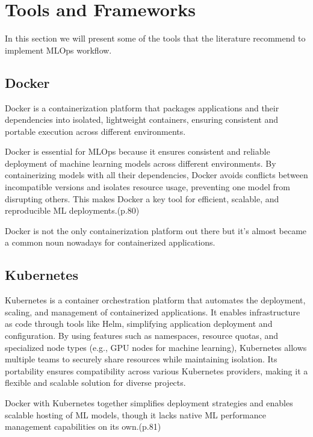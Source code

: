 \section{Tools and Frameworks}\label{sec:tools}

In this section we will present some of the tools that the literature recommend to implement MLOps workflow.

\subsection{Docker}\label{subsec:docker}
Docker\cite{docker} is a containerization platform that packages applications and their dependencies into isolated,
lightweight containers, ensuring consistent and portable execution across different environments.

Docker is essential for MLOps because it ensures consistent and reliable deployment of machine learning models across different environments.
By containerizing models with all their dependencies, Docker avoids conflicts between incompatible versions and isolates resource usage,
preventing one model from disrupting others.
This makes Docker a key tool for efficient, scalable, and reproducible ML deployments.\cite{treveil2020introducing}(p.80)

Docker is not the only containerization platform out there but it's almost became a common noun nowadays for containerized applications.

\subsection{Kubernetes}\label{subsec:kubernetes2}

Kubernetes\cite{kubernetes} is a container orchestration platform that automates the deployment, scaling, and management of containerized applications.
It enables infrastructure as code through tools like Helm, simplifying application deployment and configuration.
By using features such as namespaces, resource quotas, and specialized node types (e.g., GPU nodes for machine learning),
Kubernetes allows multiple teams to securely share resources while maintaining isolation.
Its portability ensures compatibility across various Kubernetes providers, making it a flexible and scalable solution for diverse projects.

Docker with Kubernetes together simplifies deployment strategies and enables scalable hosting of ML models,
though it lacks native ML performance management capabilities on its own.\cite{treveil2020introducing}(p.81)

